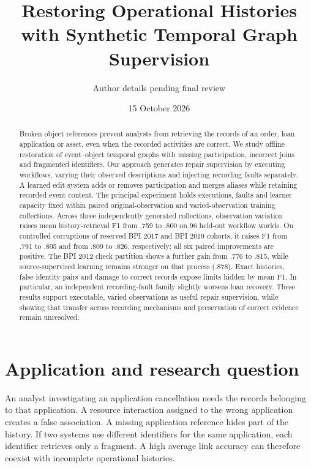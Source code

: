 \documentclass[11pt]{article}
\title{Restoring Operational Histories with Synthetic Temporal Graph Supervision}
\author{Author details pending final review}
\date{15 October 2026}
\begin{document}
\maketitle

\begin{abstract}
Broken object references prevent analysts from retrieving the records of an order, loan application or asset, even when the recorded activities are correct. We study offline restoration of event--object temporal graphs with missing participation, incorrect joins and fragmented identifiers. Our approach generates repair supervision by executing workflows, varying their observed descriptions and injecting recording faults separately. A learned edit system adds or removes participation and merges aliases while retaining recorded event content. The principal experiment holds executions, faults and learner capacity fixed within paired original-observation and varied-observation training collections. Across three independently generated collections, observation variation raises mean history-retrieval F1 from .759 to .800 on 96 held-out workflow worlds. On controlled corruptions of reserved BPI 2017 and BPI 2019 cohorts, it raises F1 from .791 to .805 and from .809 to .826, respectively; all six paired improvements are positive. The BPI 2012 check partition shows a further gain from .776 to .815, while source-supervised learning remains stronger on that process (.878). Exact histories, false identity pairs and damage to correct records expose limits hidden by mean F1. In particular, an independent recording-fault family slightly worsens loan recovery. These results support executable, varied observations as useful repair supervision, while showing that transfer across recording mechanisms and preservation of correct evidence remain unresolved.
\end{abstract}

\section{Application and research question}
An analyst investigating an application cancellation needs the records belonging to that application. A resource interaction assigned to the wrong application creates a false association. A missing application reference hides part of the history. If two systems use different identifiers for the same application, each identifier retrieves only a fragment. A high average link accuracy can therefore coexist with incomplete operational histories.
\end{document}
